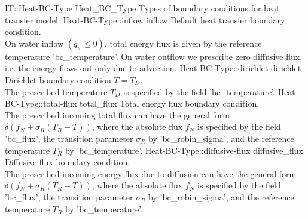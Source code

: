 \begin{SelectionType}
	{IT::Heat-BC-Type}
	{Heat{\_}BC{\_}Type}
	{{{Types of boundary conditions for heat transfer model.}%
}}
		\SelectionItem
			{Heat-BC-Type::inflow}
			{inflow}
			{{{Default heat transfer boundary condition.}\\{
On water inflow }{$(q_w \le 0)$}{, total energy flux is given by the reference temperature 'bc{\_}temperature'. On water outflow we prescribe zero diffusive flux, i.e. the energy flows out only due to advection.}%
}}
		\SelectionItem
			{Heat-BC-Type::dirichlet}
			{dirichlet}
			{{{Dirichlet boundary condition }{$T = T_D $}{.}\\{
The prescribed temperature }{$T_D$}{ is specified by the field 'bc{\_}temperature'.}%
}}
		\SelectionItem
			{Heat-BC-Type::total-flux}
			{total{\_}flux}
			{{{Total energy flux boundary condition.}\\{
The prescribed incoming total flux can have the general form }{$\delta(f_N+\sigma_R(T_R-T) )$}{, where the absolute flux }{$f_N$}{ is specified by the field 'bc{\_}flux', the transition parameter }{$\sigma_R$}{ by 'bc{\_}robin{\_}sigma', and the reference temperature }{$T_R$}{ by 'bc{\_}temperature'.}%
}}
		\SelectionItem
			{Heat-BC-Type::diffusive-flux}
			{diffusive{\_}flux}
			{{{Diffusive flux boundary condition.}\\{
The prescribed incoming energy flux due to diffusion can have the general form }{$\delta(f_N+\sigma_R(T_R-T) )$}{, where the absolute flux }{$f_N$}{ is specified by the field 'bc{\_}flux', the transition parameter }{$\sigma_R$}{ by 'bc{\_}robin{\_}sigma', and the reference temperature }{$T_R$}{ by 'bc{\_}temperature'.}%
}}
\end{SelectionType}
